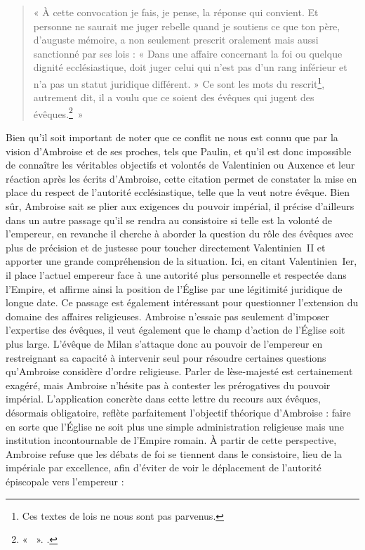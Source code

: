 \begin{quote}
    « À cette convocation je fais, je pense, la réponse qui convient. Et personne ne saurait me juger rebelle quand je soutiens ce que ton père, d’auguste mémoire, a non seulement prescrit oralement mais aussi sanctionné par ses lois : « Dans une affaire concernant la foi ou quelque dignité ecclésiastique, doit juger celui qui n’est pas d’un rang inférieur et n’a pas un statut juridique différent. » Ce sont les mots du rescrit\footnote{Ces textes de lois ne nous sont pas parvenus.}, autrement dit, il a voulu que ce soient des évêques qui jugent des évêques.\footnote{« ~». \cite[,2]{ambroise_lettres}.}~»
\end{quote}

\bigskip

Bien qu’il soit important de noter que ce conflit ne nous est connu que par la vision d’Ambroise et de ses proches, tels que Paulin, et qu’il est donc impossible de connaître les véritables objectifs et volontés de Valentinien ou Auxence et leur réaction après les écrits d’Ambroise, cette citation permet de constater la mise en place du respect de l’autorité ecclésiastique, telle que la veut notre évêque. Bien sûr, Ambroise sait se plier aux exigences du pouvoir impérial, il précise d’ailleurs dans un autre passage qu’il se rendra au consistoire si telle est la volonté de l’empereur, en revanche il cherche à aborder la question du rôle des évêques avec plus de précision et de justesse pour toucher directement Valentinien~II et apporter une grande compréhension de la situation. Ici, en citant Valentinien~Ier, il place l’actuel empereur face à une autorité plus personnelle et respectée dans l’Empire, et affirme ainsi la position de l’Église par une légitimité juridique de longue date. Ce passage est également intéressant pour questionner l'extension du domaine des affaires religieuses. Ambroise n'essaie pas seulement d'imposer l'expertise des évêques, il veut également que le champ d'action de l'Église soit plus large. L'évêque de Milan s'attaque donc au pouvoir de l'empereur en restreignant sa capacité à intervenir seul pour résoudre certaines questions qu'Ambroise considère d'ordre religieuse. Parler de lèse-majesté est certainement exagéré, mais Ambroise n'hésite pas à contester les prérogatives du pouvoir impérial. L’application concrète dans cette lettre du recours aux évêques, désormais obligatoire, reflète parfaitement l’objectif théorique d’Ambroise : faire en sorte que l’Église ne soit plus une simple administration religieuse mais une institution incontournable de l’Empire romain. À partir de cette perspective, Ambroise refuse que les débats de foi se tiennent dans le consistoire, lieu de la  impériale par excellence, afin d'éviter de voir le déplacement de l’autorité épiscopale vers l’empereur :

